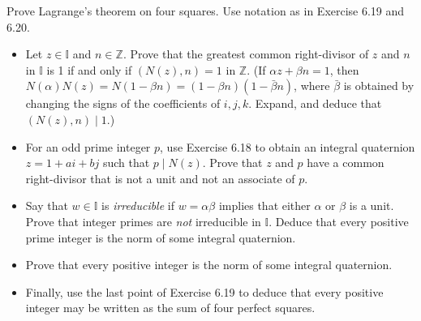 \documentclass[../../master.tex]{subfiles}
\begin{document}
\begin{problem}
    Prove Lagrange's theorem on four squares.
    Use notation as in Exercise 6.19 and 6.20.
    \begin{itemize}
        \item Let $z \in \mathbb{I}$ and $n \in \mathbb{Z}$.
            Prove that the greatest common right-divisor of $z$ and $n$ in $\mathbb{I}$ is 1 if and only if $(N(z), n) = 1$ in $\mathbb{Z}$.
            (If $\alpha z + \beta n = 1$, then $N(\alpha) N(z) = N(1 - \beta n) = (1 - \beta n) (1 - \bar{\beta} n)$, where $\bar{\beta}$ is obtained by changing the signs of the coefficients of $i, j, k$.
            Expand, and deduce that $(N(z), n) \mid 1$.)
        \item For an odd prime integer $p$, use Exercise 6.18 to obtain an integral quaternion $z = 1 + ai + bj$ such that $p \mid N(z)$.
            Prove that $z$ and $p$ have a common right-divisor that is not a unit and not an associate of $p$.
        \item Say that $w \in \mathbb{I}$ is \textit{irreducible} if $w = \alpha \beta$ implies that either $\alpha$ or $\beta$ is a unit.
            Prove that integer primes are \textit{not} irreducible in $\mathbb{I}$.
            Deduce that every positive prime integer is the norm of some integral quaternion.
        \item Prove that every positive integer is the norm of some integral quaternion.
        \item Finally, use the last point of Exercise 6.19 to deduce that every positive integer may be written as the sum of four perfect squares.
    \end{itemize}
\end{problem}
\end{document}
